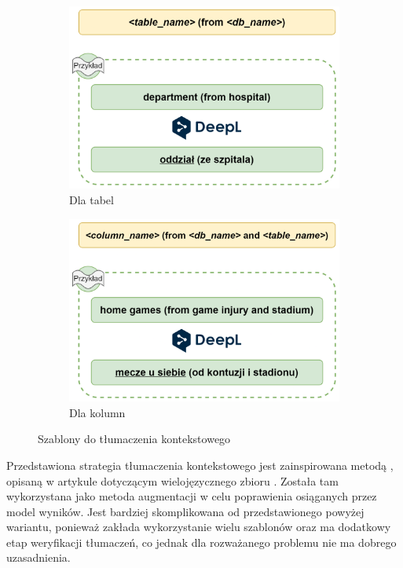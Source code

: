 \begin{figure}[ht!]
\centering
\begin{subfigure}{0.49\textwidth}
    \includegraphics[width=\textwidth]{images/translation_in_context_table.png}
    \caption{Dla tabel}
    \label{fig:first}
\end{subfigure}
\hfill
\begin{subfigure}{0.49\textwidth}
    \includegraphics[width=\textwidth]{images/translation_in_context_column.png}
    \caption{Dla kolumn}
    \label{fig:second}
\end{subfigure}
\caption{Szablony do tłumaczenia kontekstowego}
\label{fig:translation-in-context}
\end{figure}

Przedstawiona strategia tłumaczenia kontekstowego jest zainspirowana metodą , opisaną w artykule dotyczącym wielojęzycznego zbioru  . Została tam wykorzystana jako metoda augmentacji w celu poprawienia osiąganych przez model wyników. Jest bardziej skomplikowana od przedstawionego powyżej wariantu, ponieważ zakłada wykorzystanie wielu szablonów oraz ma dodatkowy etap weryfikacji tłumaczeń, co jednak dla rozważanego problemu nie ma dobrego uzasadnienia.

